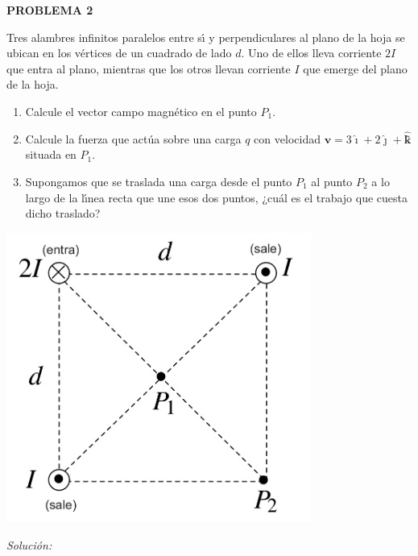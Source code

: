 \textbf{PROBLEMA 2}
\vspace{20px}

\newcommand{\ivec}{\boldsymbol{\hat{\imath}}}
\newcommand{\jvec}{\boldsymbol{\hat{\jmath}}}
\newcommand{\kvec}{\boldsymbol{\hat{k}}}

Tres alambres infinitos paralelos entre sı́ y perpendiculares al plano de la hoja se ubican en los vértices de
un cuadrado de lado $d$. Uno de ellos lleva corriente $2I$ que entra al plano, mientras que los otros llevan corriente
$I$ que emerge del plano de la hoja.\\

\begin{enumerate}[label=\alph*.]
    \item Calcule el vector campo magnético en el punto $P_1$.
    \item Calcule la fuerza que actúa sobre una carga $q$ con velocidad $\mathbf{v} = 3 \ivec
    + 2 \jvec  + \kvec$̃ situada en $P_1$.
    \item Supongamos que se traslada una carga desde el punto $P_1$ al punto $P_2$ a lo largo de la lı́nea recta que une
    esos dos puntos, ¿cuál es el trabajo que cuesta dicho traslado?
\end{enumerate}

\begin{center}
    \includegraphics[width=10cm]{files/img2}
\end{center}

\vspace{20px}
\textit{Solución:}
\\


